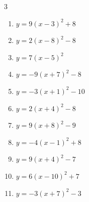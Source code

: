 \begin{multicols}{3}
\begin{enumerate}
  \item $\displaystyle y=9\left( x-3\right)^{2}+8$

        \phantom{$\displaystyle 頂点\left( 3 , 8 \right)$}

  \item $\displaystyle y=2\left( x-8\right)^{2}-8$

        \phantom{$\displaystyle 頂点\left( 8 , -8 \right)$}

  \item $\displaystyle y=7\left( x-5\right)^{2}$

        \phantom{$\displaystyle 頂点\left( 5 , 0 \right)$}

\columnbreak %

  \item $\displaystyle y=-9\left( x+7\right)^{2}-8$

        \phantom{$\displaystyle 頂点\left( -7 , -8 \right)$}

  \item $\displaystyle y=-3\left( x+1\right)^{2}-10$

        \phantom{$\displaystyle 頂点\left( -1 , -10 \right)$}

  \item $\displaystyle y=2\left( x+4\right)^{2}-8$

        \phantom{$\displaystyle 頂点\left( -4 , -8 \right)$}

  \item $\displaystyle y=9\left( x+8\right)^{2}-9$

        \phantom{$\displaystyle 頂点\left( -8 , -9 \right)$}

  \item $\displaystyle y=-4\left( x-1\right)^{2}+8$

        \phantom{$\displaystyle 頂点\left( 1 , 8 \right)$}

  \item $\displaystyle y=9\left( x+4\right)^{2}-7$

        \phantom{$\displaystyle 頂点\left( -4 , -7 \right)$}

  \item $\displaystyle y=6\left( x-10\right)^{2}+7$

        \phantom{$\displaystyle 頂点\left( 10 , 7 \right)$}

  \item $\displaystyle y=-3\left( x+7\right)^{2}-3$

        \phantom{$\displaystyle 頂点\left( -7 , -3 \right)$}


\end{enumerate}
\end{multicols}
